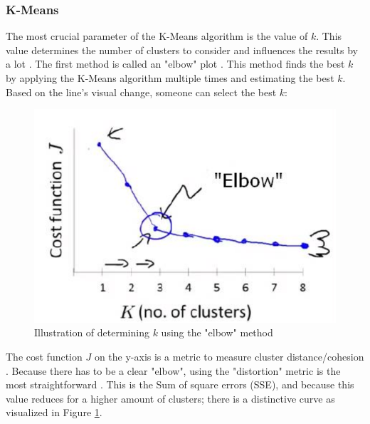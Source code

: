 \subsubsection{K-Means} \label{theory:kmeans}
The most crucial parameter of the K-Means algorithm is the value of $k$.
This value determines the number of clusters to consider and influences the results by a lot \citep{ahmed_k-means_2020}.
The first method is called an "elbow" plot \citep{kodinariya_review_2013}.
This method finds the best $k$ by applying the K-Means algorithm multiple times and estimating the best $k$.
Based on the line's visual change, someone can select the best $k$:
\begin{figure}[H]
    \includegraphics{TheorethicalFramework/dentification-of-Elbow-point.png}
    \caption{Illustration of determining $k$ using the "elbow" method \citep{kodinariya_review_2013}}
    \label{elbow-method}
\end{figure}
The cost function $J$ on the y-axis is a metric to measure cluster distance/cohesion \citep{yuan_research_2019}.
Because there has to be a clear "elbow", using the "distortion" metric is the most straightforward \citep{yuan_research_2019}. This is the Sum of square errors (SSE), and because this value reduces for a higher amount of clusters; there is a distinctive curve as visualized in Figure \ref{elbow-method}. 

